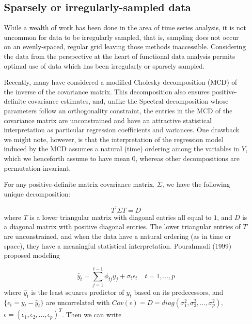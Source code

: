 \subsection{Sparsely or irregularly-sampled data} 

While a wealth of work has been done in the area of time series analysis, it is not uncommon for data to be irregularly sampled, that is, sampling does not occur on an evenly-spaced, regular grid leaving those methods inaccessible. Considering the data from the perspective at the heart of functional data analysis permits optimal use of data which has been irregularly or sparsely sampled.  

Recently, many have considered a modified Cholesky decomposition (MCD) of the inverse of the covariance matrix. This decomposition also ensures positive-definite covariance estimates, and, unlike the Spectral decomposition whose parameters follow an orthogonality constraint, the entries in the MCD of the covariance matrix are unconstrained and have an attractive statistical interpretation as particular regression coefficients and variances.  One drawback we might note, however, is that the interpretation of  the regression model induced by the MCD assumes a natural (time) ordering among the variables in $Y$, which we henceforth assume to have mean $0$, whereas other decompositions are permutation-invariant.

For any positive-definite matrix covariance matrix, $\Sigma$, we have the following unique decomposition:

\begin{equation}
   T^\prime \Sigma T  = D
   \label{eq:MCD}
   \end{equation}
  \noindent 
where $T$ is a lower triangular matrix with diagonal entries all equal to $1$, and $D$ is a diagonal matrix with positive diagonal entries. The lower triangular entries of $T$ are unconstrained, and when the data have a natural ordering (as in time or space), they have a meaningful statistical interpretation. Pourahmadi (1999) proposed modeling

   \begin{equation}   
   \hat{y}_t = \sum_{j=1}^{t-1} \phi_{tj} y_j + \sigma_t \epsilon_t \;\;\;\; t=1,\dots, p 
   \label{eq:Pourahmadimodel} 
   \end{equation}
   \noindent
where $\hat{y}_t$ is the least squares predictor of $y_t$ based on its predecessors, and $\lbrace \epsilon_t =  {y}_t - \hat{y}_t \rbrace$ are uncorrelated with $Cov\left(\epsilon\right) = D = diag\left( \sigma_1^2, \sigma_2^2, \dots, \sigma_p^2 \right)$, $\epsilon = \left(\epsilon_1, \epsilon_2, \dots, \epsilon_p \right)^T$. Then we can write

